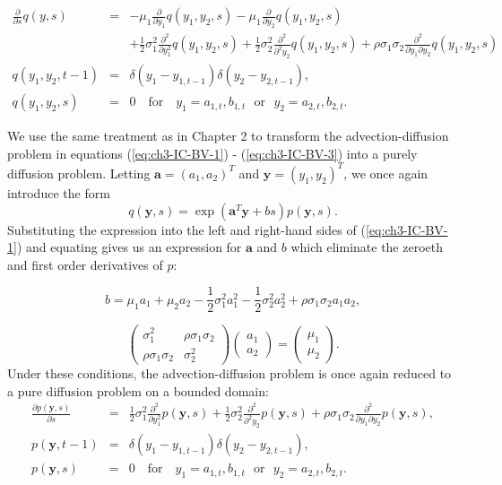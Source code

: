 \begin{eqnarray}
	\frac{\partial}{\partial s} q(y,s) &=& -\mu_1 \frac{\partial}{\partial y_1}q(y_1, y_2,s) -\mu_1 \frac{\partial}{\partial y_2}q(y_1, y_2,s) \nonumber \\
		&&  + \frac{1}{2}\sigma_1^2 \frac{\partial^2}{\partial y_1^2} q(y_1, y_2,s) + \frac{1}{2} \sigma_2^2 \frac{\partial^2}{\partial^2 y_2}q(y_1,y_2,s) + \rho \sigma_1 \sigma_2 \frac{\partial^2}{\partial y_1 \partial y_2} q(y_1, y_2, s) \label{eq:ch3-IC-BV-1} \\
	q(y_1, y_2, t-1) &=& \delta(y_1-y_{1,t-1})\delta(y_2-y_{2,t-1}), \label{eq:ch3-IC-BV-2} \\
	q(y_1, y_2, s) &=& 0 \quad \mbox{for} \quad y_1 = a_{1,t}, b_{1,t} \,\, \mbox{ or } \,\, y_2 = a_{2,t}, b_{2,t}. \label{eq:ch3-IC-BV-3}
\end{eqnarray}

We use the same treatment as in Chapter 2 to transform the advection-diffusion problem in equations (\ref{eq:ch3-IC-BV-1}) - (\ref{eq:ch3-IC-BV-3}) into a purely diffusion problem. Letting $\mathbf{a} = (a_1, a_2)^T$ and $\mathbf{y} = (y_1, y_2)^T$, we once again introduce the form 
%
\[ q(\mathbf{y}, s) = \exp(\mathbf{a}^T\mathbf{y} + bs)p(\mathbf{y}, s). \]
%
Substituting the expression into the left and right-hand sides of (\ref{eq:ch3-IC-BV-1}) and equating gives us an expression for $\mathbf{a}$ and $b$ which eliminate the zeroeth and first order derivatives of $p$:

\[ b = \mu_1 a_1 + \mu_2 a_2 - \frac{1}{2}\sigma^2_1 a_1^2 - \frac{1}{2}\sigma^2_2 a_2^2 + \rho\sigma_1 \sigma_2 a_1 a_2, \]

\[ \left( \begin{array}{cc}
		\sigma_1^2 & \rho\sigma_1 \sigma_2 \\
		\rho\sigma_1 \sigma_2 & \sigma^2_2 
 \end{array} \right) \left( \begin{array}{c}
					a_1 \\ a_2 \end{array} \right) = \left( \begin{array}{c} \mu_1 \\ \mu_2 \end{array} \right). \]
Under these conditions, the advection-diffusion problem is once again reduced to a pure diffusion problem on a bounded domain:
\begin{eqnarray}
	\frac{\partial p(\mathbf{y},s)}{\partial s} &=& \frac{1}{2}\sigma_1^2 \frac{\partial^2}{\partial y_1^2} p(\mathbf{y},s) + \frac{1}{2} \sigma_2^2 \frac{\partial^2}{\partial^2 y_2}p(\mathbf{y},s) + \rho \sigma_1 \sigma_2 \frac{\partial^2}{\partial y_1 \partial y_2} p(\mathbf{y}, s), \label{eq:ch3-heat-1} \\
	p(\mathbf{y}, t-1) &=& \delta(y_1-y_{1,t-1})\delta(y_2-y_{2,t-1}), \label{eq:ch3-heat-2} \\
	p(\mathbf{y}, s) &=& 0 \quad \mbox{for} \quad y_1 = a_{1,t}, b_{1,t} \,\, \mbox{ or } \,\, y_2 = a_{2,t}, b_{2,t}. \label{eq:ch3-heat-3}
\end{eqnarray}


